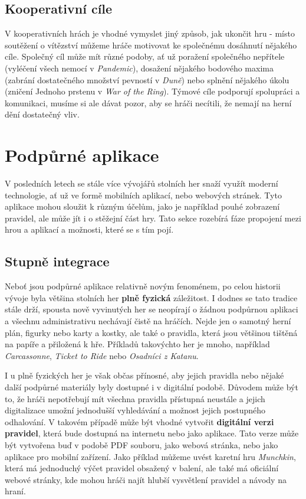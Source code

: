 \subsection{Kooperativní cíle}
\label{subsec:end_cooperative_goals}

V kooperativních hrách je vhodné vymyslet jiný způsob, jak ukončit hru - místo soutěžení o vítězství můžeme hráče motivovat ke společnému dosáhnutí nějakého cíle. Společný cíl může mít různé podoby, ať už poražení společného nepřítele (vyléčení všech nemocí v \textit{Pandemic}), dosažení nějakého bodového maxima (zabrání dostatečného množství pevností v \textit{Duně}) nebo splnění nějakého úkolu (zničení Jednoho prstenu v \textit{War of the Ring}). Týmové cíle podporují spolupráci a komunikaci, musíme si ale dávat pozor, aby se hráči necítili, že nemají na herní dění dostatečný vliv.


\section{Podpůrné aplikace}
\label{sec:apps}

V posledních letech se stále více vývojářů stolních her snaží využít moderní technologie, ať už ve formě mobilních aplikací, nebo webových stránek. Tyto aplikace mohou sloužit k různým účelům, jako je například pouhé zobrazení pravidel, ale může jít i o stěžejní část hry. Tato sekce rozebírá fáze propojení mezi hrou a aplikací a možnosti, které se s tím pojí. \cite{corvus_belli_2023}

\subsection{Stupně integrace}
\label{subsec:apps_app_integration}

Neboť jsou podpůrné aplikace relativně novým fenoménem, po celou historii vývoje byla většina stolních her \textbf{plně fyzická} záležitost. I dodnes se tato tradice stále drží, spousta nově vyvinutých her se neopírají o žádnou podpůrnou aplikaci a všechnu administrativu nechávají čistě na hráčích. Nejde jen o samotný herní plán, figurky nebo karty a kostky, ale také o pravidla, která jsou většinou tištěná na papíře a přiložená k hře. Příkladů takovýchto her je mnoho, například \textit{Carcassonne}, \textit{Ticket to Ride} nebo \textit{Osadníci z Katanu}.

I u plně fyzických her je však občas přínosné, aby jejich pravidla nebo nějaké další podpůrné materiály byly dostupné i v digitální podobě. Důvodem může být to, že hráči nepotřebují mít všechna pravidla přístupná neustále a jejich digitalizace umožní jednodušší vyhledávání a možnost jejich postupného odhalování. V takovém případě může být vhodné vytvořit \textbf{digitální verzi pravidel}, která bude dostupná na internetu nebo jako aplikace. Tato verze může být vytvořena buď v podobě PDF souboru, jako webová stránka, nebo jako aplikace pro mobilní zařízení. Jako příklad můžeme uvést karetní hru \textit{Munchkin}, která má jednoduchý výčet pravidel obsažený v balení, ale také má oficiální webové stránky, kde mohou hráči najít hlubší vysvětlení pravidel a návody na hraní.

